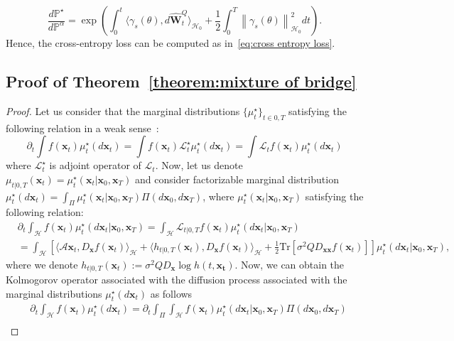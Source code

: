 \documentclass[nohyperref]{article}
\theoremstyle{plain}
\theoremstyle{remark}
\newcommand{\la}{\langle}
\newcommand{\ra}{\rangle}
\newcommand{\mc}{\mathcal}
\newcommand{\mb}{\mathbf}
\newcommand{\norm}[1]{\left\lVert#1\right\rVert}
\begin{document}
\begin{equation}
    \frac{d\mathbb{P}^{\star}}{d\mathbb{P}^{\alpha}} = \exp\left( \int_0^t \la \gamma_s(\theta), d\mb{\hat{W}}^Q_t\ra_{\mc{H}_0} + \frac{1}{2} \int_0^T  \norm{\gamma_s(\theta)}_{\mc{H}_0}^2 dt\right).
\end{equation}
Hence, the cross-entropy loss can be computed as in~\eqref{eq:cross entropy loss}.



\subsection{Proof of Theorem~\ref{theorem:mixture of bridge}}
\begin{proof}
Let us consider that the marginal distributions $\{\mu^{\star}_t\}_{t \in 0, T}$ satisfying the following relation in a weak sense~\citep{belopolskaya2012stochastic}:
\begin{equation}
    \partial_t \int f(\mb{x}_t) \mu^{\star}_t(d\mb{x}_t) =  \int f(\mb{x}_t)  \mc{L}_t^{\star}  \mu^{\star}_t(d\mb{x}_t) = \int \mc{L}_t f(\mb{x}_t) \mu^{\star}_t(d \mb{x}_t)
\end{equation}
where $\mc{L}^{\star}_t$ is adjoint operator of $\mc{L}_t$. Now, let us denote $\mu_{t|0, T}(\mb{x}_t) = \mu^{\star}_t(\mb{x}_t|\mb{x}_0, \mb{x}_T)$ and consider factorizable marginal distribution $\mu^{\star}_t(d\mb{x}_t) = \int_{\Pi} \mu^{\star}_t(\mb{x}_t|\mb{x}_0, \mb{x}_T) \Pi(d\mb{x}_0, d\mb{x}_T)$, where $\mu^{\star}_t(\mb{x}_t|\mb{x}_0, \mb{x}_T)$ satisfying the following relation:
\begin{align*}
    & \partial_t \int_{\mc{H}} f(\mb{x}_t) \mu^{\star}_t(d\mb{x}_t|\mb{x}_0, \mb{x}_T) = \int_{\mc{H}} \mc{L}_{t|0,T}f(\mb{x}_t) \mu^{\star}_t(d\mb{x}_t|\mb{x}_0, \mb{x}_T)   \\
    & = \int_{\mc{H}} \left[ \la \mc{A}\mb{x}_t, D_{\mb{x}} f(\mb{x}_t)\ra_{\mc{H}} +  \la h_{t|0, T}(\mb{x}_t) ,D_{\mb{x}} f(\mb{x}_t)\ra_{\mc{H}} + \frac{1}{2}\text{Tr}\left[ \sigma^2 Q D_{\mb{xx}}f(\mb{x}_t)\right] \right]\mu^{\star}_t(d\mb{x}_t|\mb{x}_0, \mb{x}_T),
\end{align*}
where we denote $h_{t|0, T}(\mb{x}_t) := \sigma^2 Q D_{\mb{x}} \log h(t, \mb{x_t})$.
Now, we can obtain the Kolmogorov operator associated with the diffusion process associated with the marginal distributions $\mu^{\star}_t(d\mb{x}_t)$ as follows
\begin{align}
    &\partial_t \int_{\mc{H}} f(\mb{x}_t) \mu^{\star}_{t}(d\mb{x}_t) = \partial_t 
  \int_{\Pi}  \int_{\mc{H}} f(\mb{x}_t) \mu^{\star}_t(d\mb{x}_t|\mb{x}_0, \mb{x}_T) \Pi(d\mb{x}_0, d\mb{x}_T) \\

\end{align}
\end{proof}
\end{document}
